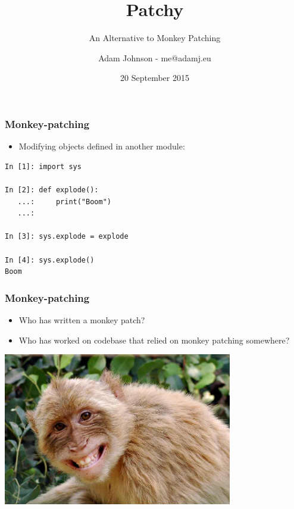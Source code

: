 \documentclass{beamer}
\title{Patchy}
\subtitle{An Alternative to Monkey Patching}
\author{Adam Johnson - me@adamj.eu}
\date{20 September 2015}
\begin{document}
\maketitle


\begin{frame}[fragile]\frametitle{Monkey-patching}

    \begin{itemize}
        \item Modifying objects defined in another module:
    \end{itemize}

    \begin{lstlisting}
In [1]: import sys

In [2]: def explode():
   ...:     print("Boom")
   ...:

In [3]: sys.explode = explode

In [4]: sys.explode()
Boom
    \end{lstlisting}

\end{frame}


\begin{frame}[fragile]\frametitle{Monkey-patching}

    \begin{itemize}
        \item Who has written a monkey patch?
        \item Who has worked on codebase that relied on monkey patching somewhere?
    \end{itemize}

    \begin{center}
        \includegraphics[width=10cm]{monkey}
    \end{center}

\end{frame}
\end{document}

